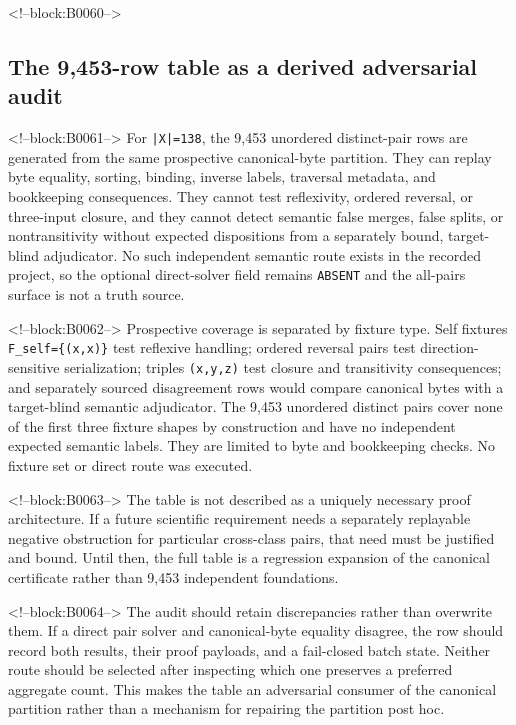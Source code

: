 \documentclass[11pt]{article}
\begin{document}
<!--block:B0060-->
\hypertarget{43-the-9453-row-table-as-a-derived-adversarial-audit}{%
\subsection{The 9,453-row table as a derived adversarial
audit}\label{43-the-9453-row-table-as-a-derived-adversarial-audit}}

<!--block:B0061-->
For \texttt{|X|=138}, the 9,453 unordered distinct-pair rows are generated from
the same prospective canonical-byte partition.  They can replay byte equality,
sorting, binding, inverse labels, traversal metadata, and bookkeeping
consequences.  They cannot test reflexivity, ordered reversal, or three-input
closure, and they cannot detect semantic false merges, false splits, or
nontransitivity without expected dispositions from a separately bound,
target-blind adjudicator.  No such independent semantic route exists in the
recorded project, so the optional direct-solver field remains \texttt{ABSENT}
and the all-pairs surface is not a truth source.

<!--block:B0062-->
Prospective coverage is separated by fixture type.  Self fixtures
\texttt{F\_self=\{(x,x)\}} test reflexive handling; ordered reversal pairs test
direction-sensitive serialization; triples \texttt{(x,y,z)} test closure and
transitivity consequences; and separately sourced disagreement rows would
compare canonical bytes with a target-blind semantic adjudicator.  The 9,453
unordered distinct pairs cover none of the first three fixture shapes by
construction and have no independent expected semantic labels.  They are limited
to byte and bookkeeping checks.  No fixture set or direct route was executed.

<!--block:B0063-->
The table is not described as a uniquely necessary proof architecture.
If a future scientific requirement needs a separately replayable
negative obstruction for particular cross-class pairs, that need must be
justified and bound. Until then, the full table is a regression
expansion of the canonical certificate rather than 9,453 independent
foundations.

<!--block:B0064-->
The audit should retain discrepancies rather than overwrite them. If a
direct pair solver and canonical-byte equality disagree, the row should
record both results, their proof payloads, and a fail-closed batch state.
Neither route should be selected after inspecting which one preserves a
preferred aggregate count. This makes the table an adversarial consumer
of the canonical partition rather than a mechanism for repairing the
partition post hoc.
\end{document}

